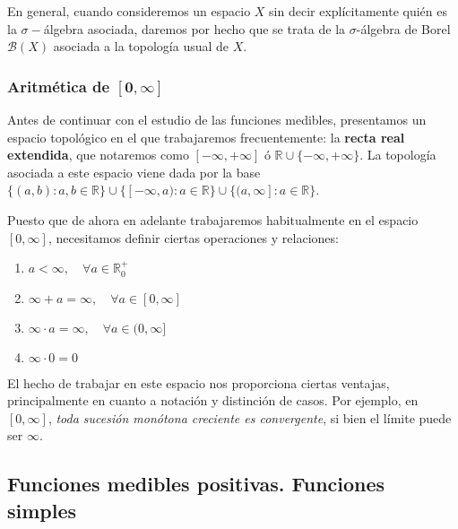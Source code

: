 \documentclass[11pt, a4paper]{article}
\newcommand{\bm}[1]{\boldsymbol{#1}}
\theoremstyle{theorem-style}
\theoremstyle{definition-style}
\theoremstyle{remark-style}
\theoremstyle{example-style}
\newenvironment{nlist}
{\begin{enumerate}
\renewcommand\labelenumi{(\emph{\roman{enumi})}}}
{\end{enumerate}}
\begin{document}
En general, cuando consideremos un espacio $X$ sin decir explícitamente quién es la $\sigma-$álgebra asociada, daremos por hecho que se trata de la $\sigma$-álgebra de Borel $\mathcal B(X)$ asociada a la topología usual de $X$.


\subsubsection{Aritmética de $\bm{[0,\infty]}$}

Antes de continuar con el estudio de las funciones medibles, presentamos un espacio topológico en el que trabajaremos frecuentemente: la \textbf{recta real extendida}, que notaremos como $[-\infty,+\infty]$ ó $\mathbb{R} \cup \{-\infty, +\infty\}$. La topología asociada a este espacio viene dada por la base $\{(a,b): a,b \in \mathbb{R}\} \cup \{[-\infty, a): a \in \mathbb{R}\} \cup \{(a,\infty]: a \in \mathbb{R}\}$.

Puesto que de ahora en adelante trabajaremos habitualmente en el espacio $[0,\infty]$, necesitamos definir ciertas operaciones y relaciones:
\begin{nlist}
    \item $a < \infty, \quad \forall a \in \mathbb{R}^+_0$
	\item $\infty + a = \infty, \quad \forall a \in [0,\infty]$
	\item $\infty \cdot a = \infty, \quad \forall a \in (0,\infty]$
    \item $\infty \cdot 0 = 0$
\end{nlist}

El hecho de trabajar en este espacio nos proporciona ciertas ventajas, principalmente en cuanto a notación y distinción de casos. Por ejemplo, en $[0, \infty]$, \textit{toda sucesión monótona creciente es convergente}, si bien el límite puede ser $\infty$.



\subsection{Funciones medibles positivas. Funciones simples}
\end{document}
